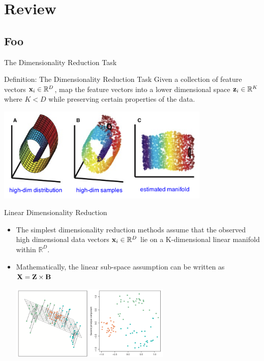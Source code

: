 \documentclass[serif,xcolor=pdftex,dvipsnames,table,hyperref={bookmarks=false,breaklinks}]{beamer}
\begin{document}
\maketitlepage

\section{Review}
\subsection{Foo}

\begin{frame}[t]{The Dimensionality Reduction Task}

\begin{block}{Definition: The Dimensionality Reduction Task}
Given a collection of feature vectors ${\mathbf{x}}_i\in\mathbb{R}^D$, map the 
feature vectors into a lower dimensional space ${\mathbf{z}}_i\in\mathbb{R}^K$ where 
$K<D$ while preserving certain properties of the data.
\end{block}

\pause
\center
\includegraphics[width=4in]{../Figures/manifold_unrolling.png}
\end{frame}


\begin{frame}[t]{Linear Dimensionality Reduction}
 
\begin{itemize}
\item The simplest dimensionality reduction methods assume that the observed 
high dimensional data vectors ${\mathbf{x}}_i\in \mathbb{R}^D$ lie on a 
K-dimensional linear manifold within $\mathbb{R}^D$. 

\item Mathematically, the linear sub-space assumption can be written as 
${\mathbf{X}} = {\mathbf{Z}}\times {\mathbf{B}}$

\center
\includegraphics[width=3in]{../Figures/linear_subspace.png}


\end{itemize} 
\end{frame}
\end{document}
